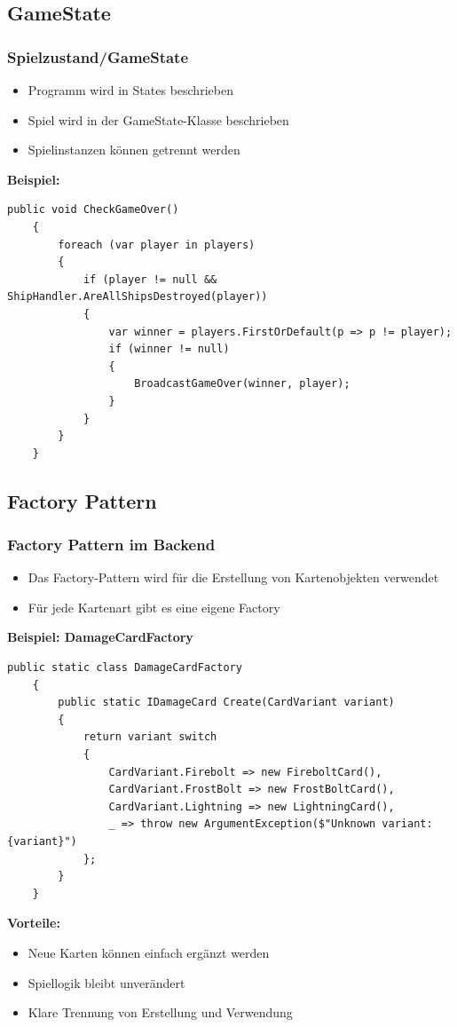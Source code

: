\documentclass{beamer}
\begin{document}
\subsection{GameState}
\begin{frame}[fragile]
  \frametitle{Spielzustand/GameState}
  \begin{itemize}
    \item Programm wird in States beschrieben
    \item Spiel wird in der GameState-Klasse beschrieben
    \item Spielinstanzen können getrennt werden
  \end{itemize}
  \textbf{Beispiel: }
  \begin{lstlisting}[language=CSharp, basicstyle=\ttfamily\tiny, breaklines=true]
    public void CheckGameOver()
    {
        foreach (var player in players)
        {
            if (player != null && ShipHandler.AreAllShipsDestroyed(player))
            {
                var winner = players.FirstOrDefault(p => p != player);
                if (winner != null)
                {
                    BroadcastGameOver(winner, player);
                }
            }
        }
    }
  \end{lstlisting}
\end{frame}

\subsection{Factory Pattern}
\begin{frame}[fragile]
\frametitle{Factory Pattern im Backend}
  \begin{itemize}
    \item Das Factory-Pattern wird für die Erstellung von Kartenobjekten verwendet
    \item Für jede Kartenart gibt es eine eigene Factory
  \end{itemize}
  
  \textbf{Beispiel: DamageCardFactory}
  \begin{lstlisting}[language=CSharp, basicstyle=\ttfamily\tiny, breaklines=true]
    public static class DamageCardFactory 
    {
        public static IDamageCard Create(CardVariant variant) 
        {
            return variant switch 
            {
                CardVariant.Firebolt => new FireboltCard(),
                CardVariant.FrostBolt => new FrostBoltCard(),
                CardVariant.Lightning => new LightningCard(),
                _ => throw new ArgumentException($"Unknown variant: {variant}")
            };
        }
    }
  \end{lstlisting}
  
  \textbf{Vorteile:}
  \begin{itemize}
    \item Neue Karten können einfach ergänzt werden
    \item Spiellogik bleibt unverändert
    \item Klare Trennung von Erstellung und Verwendung
  \end{itemize}
\end{frame}
\end{document}
